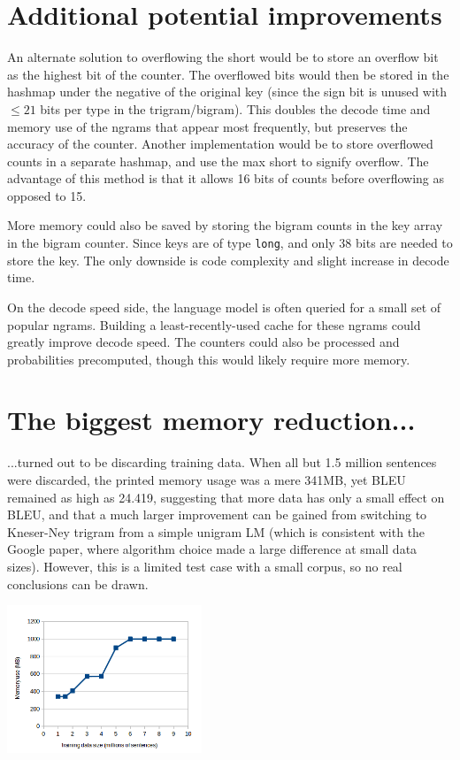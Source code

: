 \documentclass[11pt]{article}
\begin{document}
\section{Additional potential improvements}

An alternate solution to overflowing the short would be to store an overflow bit as the highest bit of the counter. The overflowed bits would then be stored in the hashmap under the negative of the original key (since the sign bit is unused with $\le21$ bits per type in the trigram/bigram). This doubles the decode time and memory use of the ngrams that appear most frequently, but preserves the accuracy of the counter. Another implementation would be to store overflowed counts in a separate hashmap, and use the max short to signify overflow. The advantage of this method is that it allows 16 bits of counts before overflowing as opposed to 15.

More memory could also be saved by storing the bigram counts in the key array in the bigram counter. Since keys are of type \texttt{long}, and only 38 bits are needed to store the key. The only downside is code complexity and slight increase in decode time.

On the decode speed side, the language model is often queried for a small set of popular ngrams. Building a least-recently-used cache for these ngrams could greatly improve decode speed. The counters could also be processed and probabilities precomputed, though this would likely require more memory. 

\section{The biggest memory reduction...}

...turned out to be discarding training data. When all but 1.5 million sentences were discarded, the printed memory usage was a mere 341MB, yet BLEU remained as high as 24.419, suggesting that more data has only a small effect on BLEU, and that a much larger improvement can be gained from switching to Kneser-Ney trigram from a simple unigram LM (which is consistent with the Google paper, where algorithm choice made a large difference at small data sizes). However, this is a limited test case with a small corpus, so no real conclusions can be drawn. 

\includegraphics[keepaspectratio=true, width=220px, trim=17px 0px 0px 0px]{memory.png}
\end{document}
